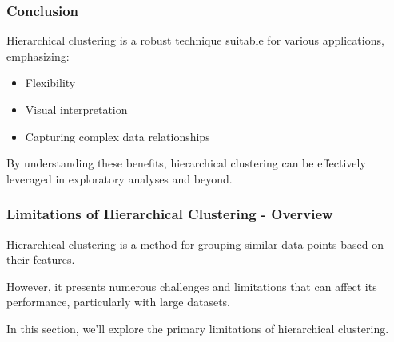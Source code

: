 \documentclass[aspectratio=169]{beamer}
\begin{document}
\begin{frame}[fragile]
    \frametitle{Conclusion}
    Hierarchical clustering is a robust technique suitable for various applications, emphasizing:
    \begin{itemize}
        \item Flexibility
        \item Visual interpretation
        \item Capturing complex data relationships
    \end{itemize}
    By understanding these benefits, hierarchical clustering can be effectively leveraged in exploratory analyses and beyond.
\end{frame}

\begin{frame}[fragile]
    \frametitle{Limitations of Hierarchical Clustering - Overview}
    Hierarchical clustering is a method for grouping similar data points based on their features.
    
    However, it presents numerous challenges and limitations that can affect its performance, particularly with large datasets.
    
    In this section, we'll explore the primary limitations of hierarchical clustering.
\end{frame}
\end{document}
